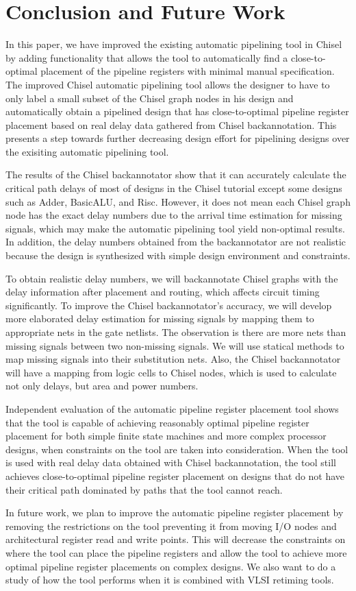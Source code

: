 \section{Conclusion and Future Work}
In this paper, we have improved the existing automatic pipelining tool in Chisel by adding functionality that allows the tool to automatically find a close-to-optimal placement of the pipeline registers with minimal manual specification. The improved Chisel automatic pipelining tool allows the designer to have to only label a small subset of the Chisel graph nodes in his design and automatically obtain a pipelined design that has close-to-optimal pipeline register placement based on real delay data gathered from Chisel backannotation. This presents a step towards further decreasing design effort for pipelining designs over the exisiting automatic pipelining tool.

The results of the Chisel backannotator show that it can accurately calculate the critical path delays of most of designs in the Chisel tutorial except some designs such as Adder, BasicALU, and Risc. However, it does not mean each Chisel graph node has the exact delay numbers due to the arrival time estimation for missing signals, which may make the automatic pipelining tool yield non-optimal results. In addition, the delay numbers obtained from the backannotator are not realistic because the design is synthesized with simple design environment and constraints.  

To obtain realistic delay numbers, we will backannotate Chisel graphs with the delay information after placement and routing, which affects circuit timing significantly. To improve the Chisel backannotator's accuracy, we will develop more elaborated delay estimation for missing signals by mapping them to appropriate nets in the gate netlists. The observation is there are more nets than missing signals between two non-missing signals. We will use statical methods to map missing signals into their substitution nets. Also, the Chisel backannotator will have a mapping from logic cells to Chisel nodes, which is used to calculate not only delays, but area and power numbers.

Independent evaluation of the automatic pipeline register placement tool shows that the tool is capable of achieving reasonably optimal pipeline register placement for both simple finite state machines and more complex processor designs, when constraints on the tool are taken into consideration. When the tool is used with real delay data obtained with Chisel backannotation, the tool still achieves close-to-optimal pipeline register placement on designs that do not have their critical path dominated by paths that the tool cannot reach.

In future work, we plan to improve the automatic pipeline register placement by removing the restrictions on the tool preventing it from moving I/O nodes and architectural register read and write points. This will decrease the constraints on where the tool can place the pipeline registers and allow the tool to achieve more optimal pipeline register placements on complex designs. We also want to do a study of how the tool performs when it is combined with VLSI retiming tools.
